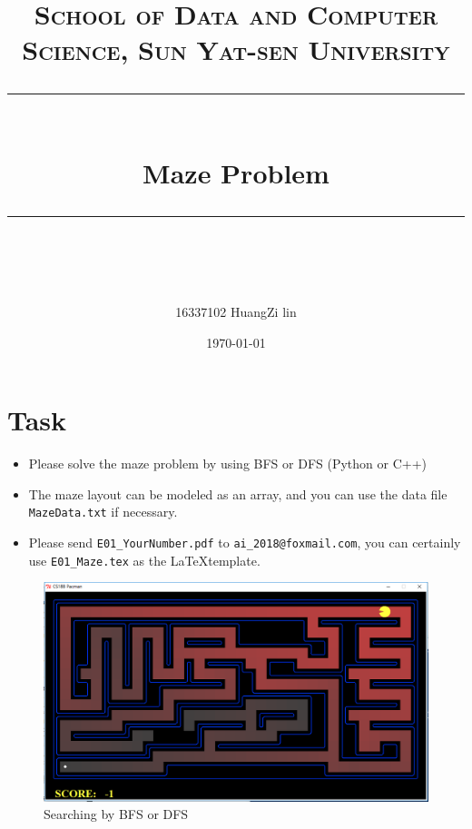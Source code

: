 \documentclass[a4paper, 11pt]{article}
\title{	
\normalfont \normalsize
\textsc{School of Data and Computer Science, Sun Yat-sen University} \\ [25pt] %
\rule{\textwidth}{0.5pt} \\[0.4cm] %
\huge  Maze Problem\\ %
\rule{\textwidth}{2pt} \\[0.5cm] %
\author{16337102 HuangZi lin}
\date{\normalsize\today}
}
\begin{document}
\maketitle
\tableofcontents
\newpage
\section{Task}



\begin{itemize}
	\item Please solve the maze problem by using BFS or DFS (Python or C++)
	\item The maze layout can be modeled as an array, and you can use the data file \texttt{MazeData.txt} if necessary.
	\item Please send \texttt{E01\_YourNumber.pdf} to \texttt{ai\_2018@foxmail.com}, you can certainly use \texttt{E01\_Maze.tex} as the \LaTeX template.
\end{itemize}

\begin{figure}[ht]
\centering
\includegraphics[width=15cm]{Pic/Pacman}

\caption{Searching by BFS or DFS}
\end{figure}
\end{document}
